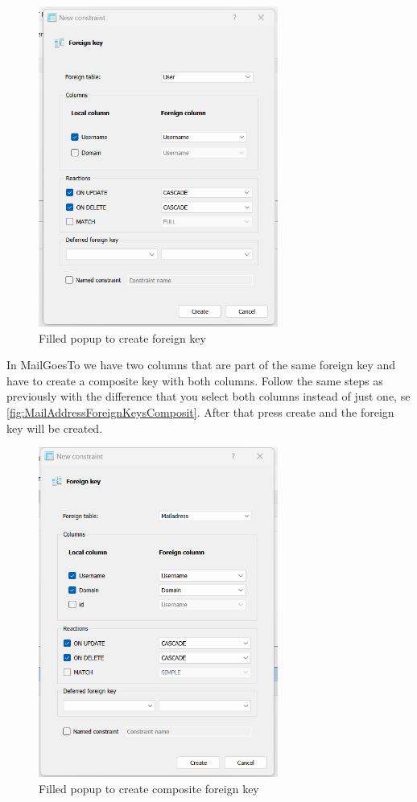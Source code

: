 \documentclass[a4paper,11pt,oneside]{article}
\begin{document}
\begin{sloppypar}
\begin{figure}[!htb]
  \includegraphics[width=0.7\textwidth]{sqlitestudio/create_foreign_key/foreign_key_populated.png}
  \caption{Filled popup to create foreign key}
  \label{fig:MailAddressForeignKeysFilledWindow}
\end{figure}   
In MailGoesTo we have two columns that are part of the same foreign key and have to create a composite key with both columns. Follow the same steps as previously with the difference that you select both columns instead of just one, se \autoref{fig:MailAddressForeignKeysComposit}. After that press create and the foreign key will be created.
\begin{figure}[!htb]
  \centering
  \includegraphics[width=0.7\textwidth]{sqlitestudio/create_foreign_key/composite_foreign_key.png}
  \caption{Filled popup to create composite foreign key}
  \label{fig:MailAddressForeignKeysComposit}
\end{figure}   

\end{sloppypar}
\end{document}
